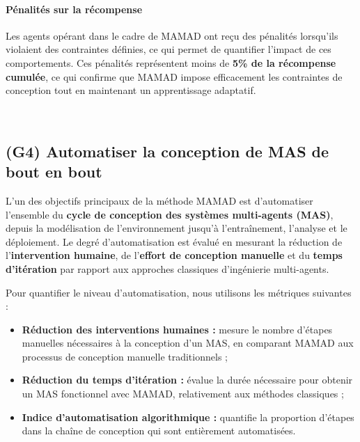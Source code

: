 \documentclass[pdflatex,sn-mathphys-num]{sn-jnl}%
\theoremstyle{thmstyleone}%
\theoremstyle{thmstyletwo}%
\theoremstyle{thmstylethree}%
\begin{document}
\paragraph{Pénalités sur la récompense}
Les agents opérant dans le cadre de MAMAD ont reçu des pénalités lorsqu'ils violaient des contraintes définies, ce qui permet de quantifier l'impact de ces comportements. Ces pénalités représentent moins de \textbf{5\% de la récompense cumulée}, ce qui confirme que MAMAD impose efficacement les contraintes de conception tout en maintenant un apprentissage adaptatif.

\

\subsection{(G4) Automatiser la conception de MAS de bout en bout}

L'un des objectifs principaux de la méthode MAMAD est d'automatiser l'ensemble du \textbf{cycle de conception des systèmes multi-agents (MAS)}, depuis la modélisation de l'environnement jusqu'à l'entraînement, l'analyse et le déploiement. Le degré d'automatisation est évalué en mesurant la réduction de l'\textbf{intervention humaine}, de l'\textbf{effort de conception manuelle} et du \textbf{temps d'itération} par rapport aux approches classiques d'ingénierie multi-agents.

Pour quantifier le niveau d'automatisation, nous utilisons les métriques suivantes :

\begin{itemize}
    \item \textbf{Réduction des interventions humaines :} mesure le nombre d'étapes manuelles nécessaires à la conception d'un MAS, en comparant MAMAD aux processus de conception manuelle traditionnels ;
    \item \textbf{Réduction du temps d'itération :} évalue la durée nécessaire pour obtenir un MAS fonctionnel avec MAMAD, relativement aux méthodes classiques ;
    \item \textbf{Indice d'automatisation algorithmique :} quantifie la proportion d'étapes dans la chaîne de conception qui sont entièrement automatisées.
\end{itemize}
\end{document}

